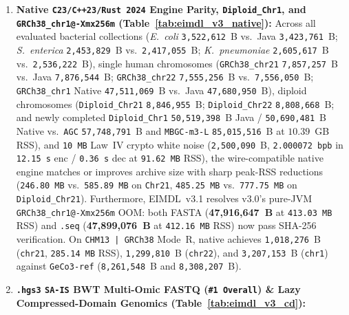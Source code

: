 \documentclass[10pt]{article}
\theoremstyle{definition}
\begin{document}
\begin{enumerate}
  \item \textbf{Native \texttt{C23/C++23/Rust~2024} Engine Parity, \texttt{Diploid\_Chr1}, and \texttt{GRCh38\_chr1@-Xmx256m} (Table~\ref{tab:eimdl_v3_native}):}
  Across all evaluated bacterial collections (\textit{E.~coli} \texttt{3,522,612}~B vs.\ Java \texttt{3,423,761}~B; \textit{S.~enterica} \texttt{2,453,829}~B vs.\ \texttt{2,417,055}~B; \textit{K.~pneumoniae} \texttt{2,605,617}~B vs.\ \texttt{2,536,222}~B), single human chromosomes (\texttt{GRCh38\_chr21} \texttt{7,857,257}~B vs.\ Java \texttt{7,876,544}~B; \texttt{GRCh38\_chr22} \texttt{7,555,256}~B vs.\ \texttt{7,556,050}~B; \texttt{GRCh38\_chr1} Native \texttt{47,511,069}~B vs.\ Java \texttt{47,680,950}~B), diploid chromosomes (\texttt{Diploid\_Chr21} \texttt{8,846,955}~B; \texttt{Diploid\_Chr22} \texttt{8,808,668}~B; and newly completed \texttt{Diploid\_Chr1} \texttt{50,519,398}~B Java / \texttt{50,690,481}~B Native vs.\ \texttt{AGC} \texttt{57,748,791}~B and \texttt{MBGC-m3-L} \texttt{85,015,516}~B at $10.39$~GB RSS), and \texttt{10~MB} Law~IV crypto white noise (\texttt{2,500,090}~B, \texttt{2.000072~bpb} in \texttt{12.15~s} enc / \texttt{0.36~s} dec at \texttt{91.62~MB} RSS), the wire-compatible native engine matches or improves archive size with sharp peak-RSS reductions (\texttt{246.80~MB} vs.\ \texttt{585.89~MB} on \texttt{Chr21}, \texttt{485.25~MB} vs.\ \texttt{777.75~MB} on \texttt{Diploid\_Chr21}). Furthermore, EIMDL~v3.1 resolves v3.0's pure-JVM \texttt{GRCh38\_chr1@-Xmx256m} OOM: both FASTA (\textbf{47,916,647~B} at \texttt{413.03~MB} RSS) and \texttt{.seq} (\textbf{47,899,076~B} at \texttt{412.16~MB} RSS) now pass SHA-256 verification. On \texttt{CHM13 | GRCh38} Mode~R, native achieves \texttt{1,018,276}~B (\texttt{chr21}, \texttt{285.14~MB} RSS), \texttt{1,299,810}~B (\texttt{chr22}), and \texttt{3,207,153}~B (\texttt{chr1}) against \texttt{GeCo3-ref} (\texttt{8,261,548}~B and \texttt{8,308,207}~B).
  \item \textbf{\texttt{.hgs3} \texttt{SA-IS} BWT Multi-Omic FASTQ (\texttt{\#1 Overall}) \& Lazy Compressed-Domain Genomics (Table~\ref{tab:eimdl_v3_cd}):}

\end{enumerate}
\end{document}
